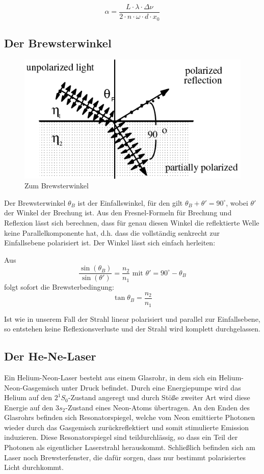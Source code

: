 \begin{equation} \boxed{\alpha = \frac{L\cdot\lambda\cdot\Delta\nu}{2\cdot n\cdot\omega\cdot d \cdot x_0}} \end{equation}

\subsection{Der Brewsterwinkel}

\begin{figure}[H]
	\centering \includegraphics[width = 0.6 \textwidth]{Bilder/brewster.jpg}
	\caption{Zum Brewsterwinkel}
\end{figure}

Der Brewsterwinkel $\theta_B$ ist der Einfallswinkel, für den gilt $\theta_B + \theta' = 90^\circ$, wobei $\theta'$ der Winkel der Brechung ist. Aus den Fresnel-Formeln für Brechung und Reflexion lässt sich berechnen, dass für genau diesen Winkel die reflektierte Welle keine Parallelkomponente hat, d.h. dass die vollständig senkrecht zur Einfallsebene polarisiert ist. Der Winkel lässt sich einfach herleiten:

Aus $$ \frac{\sin(\theta_B)}{\sin(\theta')} = \frac{n_2}{n_1} \text{ \ mit \ } \theta' = 90^\circ - \theta_B$$ folgt sofort die Brewsterbedingung: 
\begin{equation} \tan\theta_B = \frac{n_2}{n_1} \end{equation}

Ist wie in unserem Fall der Strahl linear polarisiert und parallel zur Einfallsebene, so entstehen keine Reflexionsverluste und der Strahl wird komplett durchgelassen.

\subsection{Der He-Ne-Laser}

Ein Helium-Neon-Laser besteht aus einem Glasrohr, in dem sich ein Helium-Neon-Gasgemisch unter Druck befindet. Durch eine Energiepumpe wird das Helium auf den $2^1 S_0$-Zustand angeregt und durch Stöße zweiter Art wird diese Energie auf den $3 s_2$-Zustand eines Neon-Atoms übertragen. An den Enden des Glasrohrs befinden sich Resonatorspiegel, welche vom Neon emittierte Photonen wieder durch das Gasgemisch zurückreflektiert und somit stimulierte Emission induzieren. Diese Resonatorspiegel sind teildurchlässig, so dass ein Teil der Photonen als eigentlicher Laserstrahl herauskommt. Schließlich befinden sich am Laser noch Brewsterfenster, die dafür sorgen, dass nur bestimmt polarisiertes Licht durchkommt.

